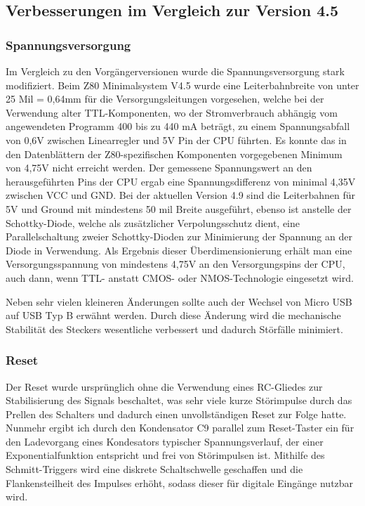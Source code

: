 \subsection{Verbesserungen im Vergleich zur Version 4.5}
\subsubsection{Spannungsversorgung}
Im Vergleich zu den Vorgängerversionen wurde die Spannungsversorgung stark modifiziert. Beim Z80 Minimalsystem V4.5 wurde eine Leiterbahnbreite von unter 25 Mil = 0,64mm für die Versorgungsleitungen vorgesehen, welche bei der Verwendung alter TTL-Komponenten, wo der Stromverbrauch abhängig vom angewendeten Programm 400 bis zu 440 mA beträgt, zu einem Spannungsabfall von 0,6V zwischen Linearregler und 5V Pin der CPU führten. Es konnte das in den Datenblättern der Z80-spezifischen Komponenten vorgegebenen Minimum von 4,75V nicht erreicht werden. Der gemessene Spannungswert an den herausgeführten Pins der CPU ergab eine Spannungsdifferenz von minimal 4,35V zwischen VCC und GND. Bei der aktuellen Version 4.9 sind die Leiterbahnen für 5V und Ground mit mindestens 50 mil Breite ausgeführt, ebenso ist anstelle der Schottky-Diode, welche als zusätzlicher Verpolungsschutz dient, eine Parallelschaltung zweier Schottky-Dioden zur Minimierung der Spannung an der Diode in Verwendung. Als Ergebnis dieser Überdimensionierung erhält man eine Versorgungsspannung von mindestens 4,75V an den Versorgungspins der CPU, auch dann, wenn TTL- anstatt CMOS- oder NMOS-Technologie eingesetzt wird.

Neben sehr vielen kleineren Änderungen sollte auch der Wechsel von Micro USB auf USB Typ B erwähnt werden. Durch diese Änderung wird die mechanische Stabilität des Steckers wesentliche verbessert und dadurch Störfälle minimiert.

\subsubsection{Reset}
Der Reset wurde ursprünglich ohne die Verwendung eines RC-Gliedes zur Stabilisierung des Signals beschaltet, was sehr viele kurze Störimpulse durch das Prellen des Schalters und dadurch einen unvollständigen Reset zur Folge hatte. Nunmehr ergibt ich durch den Kondensator C9 parallel zum Reset-Taster ein für den Ladevorgang eines Kondesators typischer Spannungsverlauf, der einer Exponentialfunktion entspricht und frei von Störimpulsen ist. Mithilfe des Schmitt-Triggers wird eine diskrete Schaltschwelle geschaffen und die Flankensteilheit des Impulses erhöht, sodass dieser für digitale Eingänge nutzbar wird.

